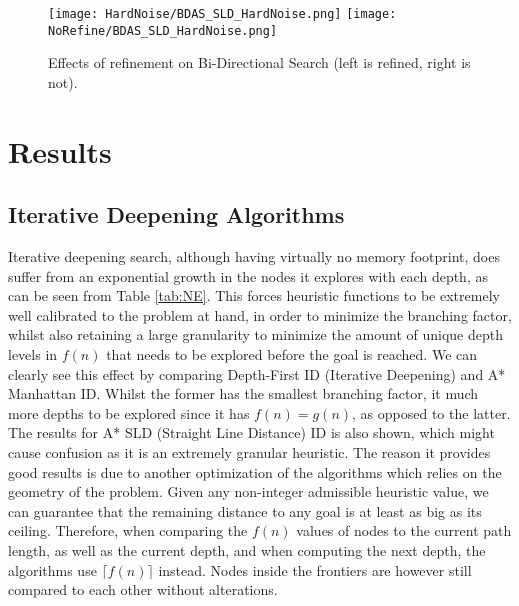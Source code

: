 \documentclass[conference]{IEEEtran}
\begin{document}
\begin{figure}[H]
    \centering
     \texttt{[image: HardNoise/BDAS\_SLD\_HardNoise.png]}
     \texttt{[image: NoRefine/BDAS\_SLD\_HardNoise.png]}
    \caption{Effects of refinement on Bi-Directional Search (left is refined, right is not).}    
    \label{fig:RefineEffects}
\end{figure}



\section{Results}

\subsection{Iterative Deepening Algorithms}
Iterative deepening search, although having virtually no memory footprint, does suffer from an exponential growth in the nodes it explores with each depth, as can be seen from Table \ref{tab:NE}. This forces heuristic functions to be extremely well calibrated to the problem at hand, in order to minimize the branching factor, whilst also retaining a large granularity to minimize the amount of unique depth levels in $f(n)$ that needs to be explored before the goal is reached. We can clearly see this effect by comparing Depth-First ID (Iterative Deepening) and A* Manhattan ID. Whilst the former has the smallest branching factor, it much more depths to be explored since it has $f(n) = g(n)$, as opposed to the latter. The results for A* SLD (Straight Line Distance) ID is also shown, which might cause confusion as it is an extremely granular heuristic. The reason it provides good results is due to another optimization of the algorithms which relies on the geometry of the problem. Given any non-integer admissible heuristic value, we can guarantee that the remaining distance to any goal is at least as big as its ceiling. Therefore, when comparing the $f(n)$ values of nodes to the current path length, as well as the current depth, and when computing the next depth, the algorithms use $\lceil f(n) \rceil$ instead. Nodes inside the frontiers are however still compared to each other without alterations.
\end{document}

